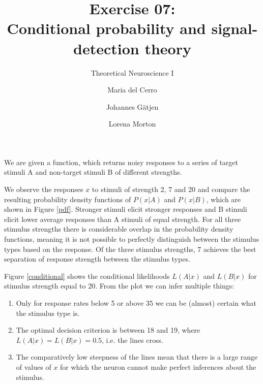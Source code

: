 \documentclass{scrartcl}
\title{Exercise 07:\\Conditional probability and signal-detection theory}
\subtitle{Theoretical Neuroscience I}
\author{Maria del Cerro \and Johannes G\"atjen \and Lorena Morton}
\begin{document}
\maketitle

We are given a function, which returns noisy responses to a series of target stimuli A and non-target stimuli B of different strengths.

We observe the responses $x$ to stimuli of strength 2, 7 and 20 and compare the resulting probability density functions of $P(x|A)$ and $P(x|B)$, which are shown in Figure \ref{pdf}. Stronger stimuli elicit stronger responses and B stimuli elicit lower average responses than A stimuli of equal strength. For all three stimulus strengths there is considerable overlap in the probability density functions, meaning it is not possible to perfectly distinguish between the stimulus types based on the response. Of the three stimulus strengths, 7 achieves the best separation of response strength between the stimulus types.

Figure \ref{conditional} shows the conditional likelihoods $L(A|x)$ and $L(B|x)$ for stimulus strength equal to 20. From the plot we can infer multiple things:
\begin{enumerate}
\item Only for response rates below 5 or above 35 we can be (almost) certain what the stimulus type is.
\item The optimal decision criterion is between 18 and 19, where $L(A|x) = L(B|x) = 0.5$, i.e. the lines cross.
\item The comparatively low steepness of the lines mean that there is a large range of values of $x$ for which the neuron cannot make perfect inferences about the stimulus.
\end{enumerate}
\end{document}
